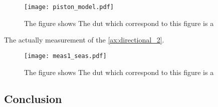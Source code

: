 \begin{figure}[H]
	\centering
	\texttt{[image: piston\_model.pdf]}
	\caption{The figure shows  The \gls{dut} which correspond to this figure is a \citep{seas33}}
		\label{fig:piston_model_of_seas33}
\end{figure}

The actually measurement of the \citep{seas33}  \autoref{ax:directional_2}.

\begin{figure}[H]
	\centering
	\texttt{[image: meas1\_seas.pdf]}
	\caption{The figure shows  The \gls{dut} which correspond to this figure is a \citep{seas33}}
		\label{fig:speaker_model}
\end{figure}

\subsection{Conclusion}